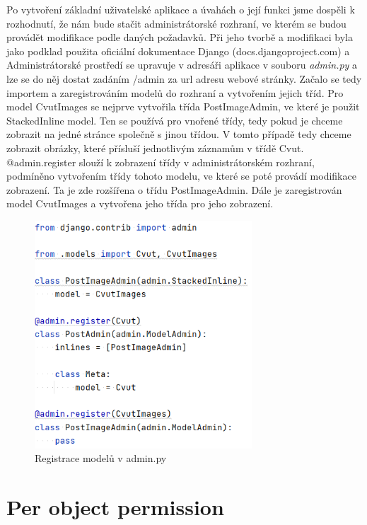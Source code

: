 Po vytvoření základní uživatelské aplikace a úvahách o její funkci jsme dospěli k rozhodnutí, že nám bude stačit administrátorské rozhraní, ve kterém se budou provádět modifikace podle daných požadavků.
Při jeho tvorbě a modifikaci byla jako podklad použita oficiální dokumentace Django (docs.djangoproject.com) a \cite{django-admin-book} Administrátorské prostředí se upravuje v adresáři aplikace v souboru \emph{admin.py} a lze se do něj dostat zadáním /admin za url adresu webové stránky. Začalo se tedy importem a zaregistrováním modelů do rozhraní a vytvořením jejich tříd. Pro model CvutImages se nejprve vytvořila třída PostImageAdmin, ve které je použit StackedInline model. Ten se používá pro vnořené třídy, tedy pokud je chceme zobrazit na jedné stránce společně s jinou třídou. V tomto případě tedy chceme zobrazit obrázky, které přísluší jednotlivým záznamům v třídě Cvut. @admin.register slouží k zobrazení třídy v administrátorském rozhraní, podmíněno vytvořením třídy tohoto modelu, ve které se poté provádí modifikace zobrazení. Ta je zde rozšířena o třídu PostImageAdmin. Dále je zaregistrován model CvutImages a vytvořena jeho třída pro jeho zobrazení.

\begin{figure}[H] \centering
    \includegraphics[width=230pt]{./pictures/12-admin-reg.PNG}
    \caption[Registrace modelů v admin.py]{Registrace modelů v admin.py}
	\label{fig:Registrace modelů v admin.py}              
\end{figure}

\newpage

\section{Per object permission}

